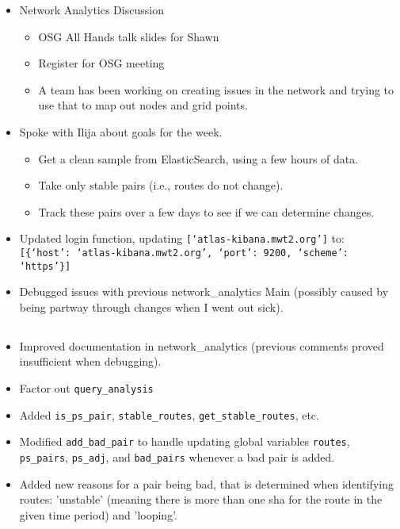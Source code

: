 \documentclass{weeklyreport}
\begin{document}
\begin{itemize}
    \item Network Analytics Discussion
    \begin{itemize}
    	\item OSG All Hands talk slides for Shawn
    	\item Register for OSG meeting
    	\item A team has been working on creating issues in the network and trying to use that to map out nodes and grid points.
    \end{itemize}
    \item Spoke with Ilija about goals for the week.
    \begin{itemize}
		\item Get a clean sample from ElasticSearch, using a few hours of data.
		\item Take only stable pairs (i.e., routes do not change).
		\item Track these pairs over a few days to see if we can determine changes.
	\end{itemize}
	\item Updated login function, updating 
	\texttt{[`atlas-kibana.mwt2.org']} to:\\ \texttt{[\{`host': `atlas-kibana.mwt2.org', `port': 9200, `scheme': `https'\}]}
	\item Debugged issues with previous network\_analytics Main (possibly caused by being partway through changes when I went out sick).
\end{itemize}


\subsection*{}

\begin{itemize}
    \item Improved documentation in network\_analytics (previous comments proved insufficient when debugging).
    \item Factor out \texttt{query\_analysis}
    \item Added \texttt{is\_ps\_pair}, \texttt{stable\_routes}, \texttt{get\_stable\_routes}, etc.
    \item Modified \texttt{add\_bad\_pair} to handle updating global variables \texttt{routes}, \texttt{ps\_pairs}, \texttt{ps\_adj}, and \texttt{bad\_pairs} whenever a bad pair is added. 
    \item Added new reasons for a pair being bad, that is determined when identifying routes: 'unstable' (meaning there is more than one sha for the route in the given time period) and 'looping'.
\end{itemize}
\end{document}
